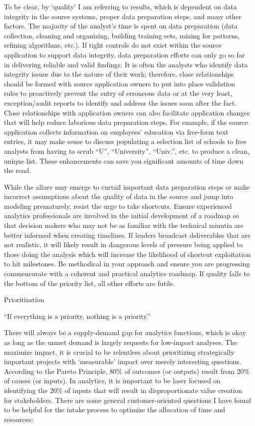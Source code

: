 \documentclass[]{book}
\begin{document}
To be clear, by `quality' I am referring to results, which is dependent on data integrity in the source systems, proper data preparation steps, and many other factors. The majority of the analyst's time is spent on data preparation (data collection, cleaning and organizing, building training sets, mining for patterns, refining algorithms, etc.). If tight controls do not exist within the source application to support data integrity, data preparation efforts can only go so far in delivering reliable and valid findings. It is often the analysts who identify data integrity issues due to the nature of their work; therefore, close relationships should be formed with source application owners to put into place validation rules to proactively prevent the entry of erroneous data or at the very least, exception/audit reports to identify and address the issues soon after the fact. Close relationships with application owners can also facilitate application changes that will help reduce laborious data preparation steps. For example, if the source application collects information on employees' education via free-form text entries, it may make sense to discuss populating a selection list of schools to free analysts from having to scrub ``U'', ``University'', ``Univ.'', etc. to produce a clean, unique list. These enhancements can save you significant amounts of time down the road.

While the allure may emerge to curtail important data preparation steps or make incorrect assumptions about the quality of data in the source and jump into modeling prematurely, resist the urge to take shortcuts. Ensure experienced analytics professionals are involved in the initial development of a roadmap so that decision makers who may not be as familiar with the technical minutia are better informed when creating timelines. If leaders broadcast deliverables that are not realistic, it will likely result in dangerous levels of pressure being applied to those doing the analysis which will increase the likelihood of shortcut exploitation to hit milestones. Be methodical in your approach and ensure you are progressing commensurate with a coherent and practical analytics roadmap. If quality falls to the bottom of the priority list, all other efforts are futile.

 Prioritization

``If everything is a priority, nothing is a priority.''

There will always be a supply-demand gap for analytics functions, which is okay as long as the unmet demand is largely requests for low-impact analyses. The maximize impact, it is crucial to be relentless about prioritizing strategically important projects with `measurable' impact over merely interesting questions. According to the Pareto Principle, 80\% of outcomes (or outputs) result from 20\% of causes (or inputs). In analytics, it is important to be laser focused on identifying the 20\% of inputs that will result in disproportionate value creation for stakeholders. There are some general customer-oriented questions I have found to be helpful for the intake process to optimize the allocation of time and resources:
\end{document}
